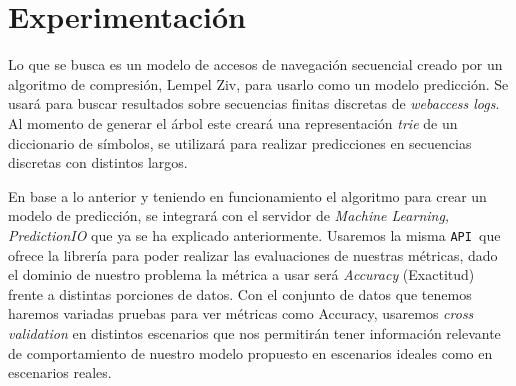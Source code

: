 \chapter[Experimentación]{Experimentación}\label{ch:experimetal-all}





{
}

Lo que se busca es un modelo de accesos de navegación secuencial creado por un algoritmo de compresión, Lempel Ziv,  para usarlo como un modelo  predicción. Se usará para buscar resultados sobre secuencias finitas discretas de \emph{webaccess logs}. Al momento de generar el árbol este creará una representación \emph{trie} de un diccionario de símbolos, se utilizará para realizar predicciones en secuencias discretas con distintos largos.

En base a lo anterior y teniendo en funcionamiento el algoritmo para crear un modelo de predicción, se integrará con el servidor de \emph{Machine Learning, PredictionIO} que ya se ha explicado anteriormente. Usaremos la misma \texttt{API }que ofrece la librería para poder realizar las evaluaciones de nuestras métricas, dado el dominio de nuestro problema la métrica a usar será \emph{Accuracy} (Exactitud) frente a distintas porciones de datos. Con el conjunto de datos que tenemos haremos variadas pruebas para ver métricas como Accuracy, usaremos \emph{cross validation} en distintos escenarios que nos permitirán tener información relevante de comportamiento de nuestro modelo propuesto en escenarios ideales como en escenarios reales.


